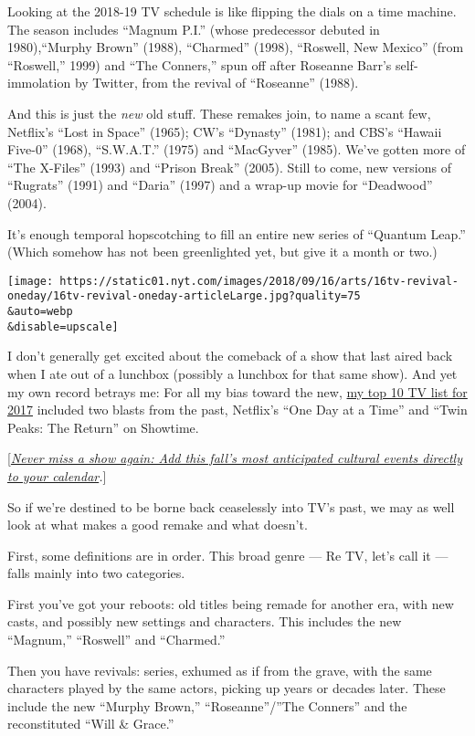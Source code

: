 Looking at the 2018-19 TV schedule is like flipping the dials on a time
machine. The season includes ``Magnum P.I.'' (whose predecessor debuted
in 1980),``Murphy Brown'' (1988), ``Charmed'' (1998), ``Roswell, New
Mexico'' (from ``Roswell,'' 1999) and ``The Conners,'' spun off after
Roseanne Barr's self-immolation by Twitter, from the revival of
``Roseanne'' (1988).

And this is just the \emph{new} old stuff. These remakes join, to name a
scant few, Netflix's ``Lost in Space'' (1965); CW's ``Dynasty'' (1981);
and CBS's ``Hawaii Five-0'' (1968), ``S.W.A.T.'' (1975) and ``MacGyver''
(1985). We've gotten more of ``The X-Files'' (1993) and ``Prison Break''
(2005). Still to come, new versions of ``Rugrats'' (1991) and ``Daria''
(1997) and a wrap-up movie for ``Deadwood'' (2004).

It's enough temporal hopscotching to fill an entire new series of
``Quantum Leap.'' (Which somehow has not been greenlighted yet, but give
it a month or two.)

\texttt{[image: https://static01.nyt.com/images/2018/09/16/arts/16tv-revival-oneday/16tv-revival-oneday-articleLarge.jpg?quality=75\\\&auto=webp\\\&disable=upscale]}

I don't generally get excited about the comeback of a show that last
aired back when I ate out of a lunchbox (possibly a lunchbox for that
same show). And yet my own record betrays me: For all my bias toward the
new,
\href{https://www.nytimes.com/2017/12/04/arts/television/best-tv-shows.html}{my
top 10 TV list for 2017} included two blasts from the past, Netflix's
``One Day at a Time'' and ``Twin Peaks: The Return'' on Showtime.

{[}\href{https://www.nytimes.com/interactive/2018/arts/nyc-arts-calendar.html}{\emph{Never
miss a show again: Add this fall's most anticipated cultural events
directly to your calendar}}\emph{.}{]}

So if we're destined to be borne back ceaselessly into TV's past, we may
as well look at what makes a good remake and what doesn't.

First, some definitions are in order. This broad genre --- Re TV, let's
call it --- falls mainly into two categories.

First you've got your reboots: old titles being remade for another era,
with new casts, and possibly new settings and characters. This includes
the new ``Magnum,'' ``Roswell'' and ``Charmed.''

Then you have revivals: series, exhumed as if from the grave, with the
same characters played by the same actors, picking up years or decades
later. These include the new ``Murphy Brown,'' ``Roseanne''/''The
Conners'' and the reconstituted ``Will \& Grace.''

